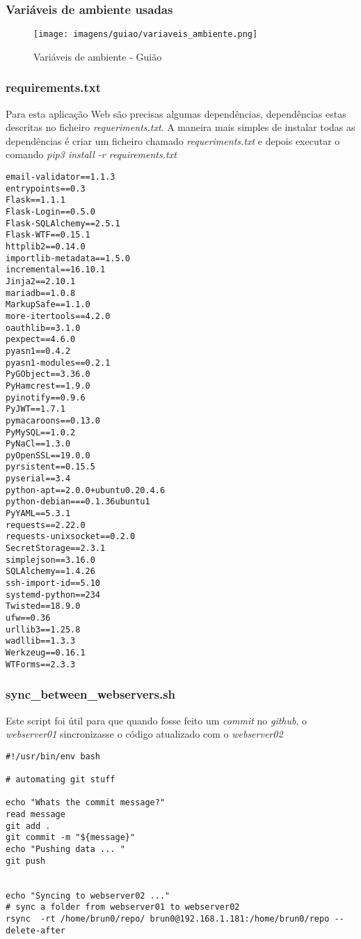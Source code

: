 \documentclass{report}
\begin{document}
\clearpage

\subsubsection{Variáveis de ambiente usadas}

\begin{figure}[H]
\center
\texttt{[image: imagens/guiao/variaveis\_ambiente.png]}
\caption{Variáveis de ambiente - Guião}
\label{fig.nav}
\end{figure}



\subsubsection{requirements.txt}
Para esta aplicação Web são precisas algumas dependências, dependências estas descritas no ficheiro \emph{requeriments.txt}. A maneira mais simples de instalar todas as dependências é criar um ficheiro chamado \emph{requeriments.txt} e depois executar o comando \emph{pip3 install -r requirements.txt}

\begin{lstlisting}
email-validator==1.1.3
entrypoints==0.3
Flask==1.1.1
Flask-Login==0.5.0
Flask-SQLAlchemy==2.5.1
Flask-WTF==0.15.1
httplib2==0.14.0
importlib-metadata==1.5.0
incremental==16.10.1
Jinja2==2.10.1
mariadb==1.0.8
MarkupSafe==1.1.0
more-itertools==4.2.0
oauthlib==3.1.0
pexpect==4.6.0
pyasn1==0.4.2
pyasn1-modules==0.2.1
PyGObject==3.36.0
PyHamcrest==1.9.0
pyinotify==0.9.6
PyJWT==1.7.1
pymacaroons==0.13.0
PyMySQL==1.0.2
PyNaCl==1.3.0
pyOpenSSL==19.0.0
pyrsistent==0.15.5
pyserial==3.4
python-apt==2.0.0+ubuntu0.20.4.6
python-debian===0.1.36ubuntu1
PyYAML==5.3.1
requests==2.22.0
requests-unixsocket==0.2.0
SecretStorage==2.3.1
simplejson==3.16.0
SQLAlchemy==1.4.26
ssh-import-id==5.10
systemd-python==234
Twisted==18.9.0
ufw==0.36
urllib3==1.25.8
wadllib==1.3.3
Werkzeug==0.16.1
WTForms==2.3.3
\end{lstlisting}


\subsubsection{sync\_between\_webservers.sh}
Este script foi útil para que quando fosse feito um \emph{commit} no \emph{github}, o \emph{webserver01} sincronizasse o código atualizado com o \emph{webserver02}
\begin{lstlisting}
#!/usr/bin/env bash

# automating git stuff

echo "Whats the commit message?"
read message
git add .
git commit -m "${message}"
echo "Pushing data ... "
git push


echo "Syncing to webserver02 ..."
# sync a folder from webserver01 to webserver02
rsync  -rt /home/brun0/repo/ brun0@192.168.1.181:/home/brun0/repo --delete-after
\end{lstlisting}
\end{document}
